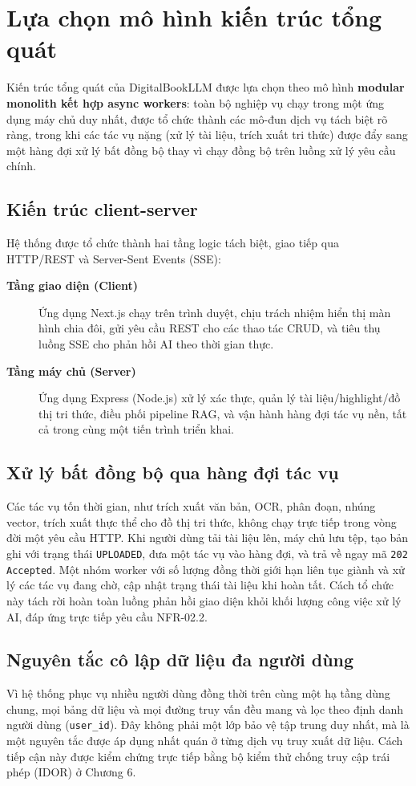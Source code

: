 \section{Lựa chọn mô hình kiến trúc tổng quát}
Kiến trúc tổng quát của DigitalBookLLM được lựa chọn theo mô hình \textbf{modular monolith kết hợp async workers}: toàn bộ nghiệp vụ chạy trong một ứng dụng máy chủ duy nhất, được tổ chức thành các mô-đun dịch vụ tách biệt rõ ràng, trong khi các tác vụ nặng (xử lý tài liệu, trích xuất tri thức) được đẩy sang một hàng đợi xử lý bất đồng bộ thay vì chạy đồng bộ trên luồng xử lý yêu cầu chính.

\subsection{Kiến trúc client-server}
Hệ thống được tổ chức thành hai tầng logic tách biệt, giao tiếp qua HTTP/REST và Server-Sent Events (SSE):

\begin{description}
    \item[\textbf{Tầng giao diện (Client)}] Ứng dụng Next.js chạy trên trình duyệt, chịu trách nhiệm hiển thị màn hình chia đôi, gửi yêu cầu REST cho các thao tác CRUD, và tiêu thụ luồng SSE cho phản hồi AI theo thời gian thực.
    \item[\textbf{Tầng máy chủ (Server)}] Ứng dụng Express (Node.js) xử lý xác thực, quản lý tài liệu/highlight/đồ thị tri thức, điều phối pipeline RAG, và vận hành hàng đợi tác vụ nền, tất cả trong cùng một tiến trình triển khai.
\end{description}

\subsection{Xử lý bất đồng bộ qua hàng đợi tác vụ}
Các tác vụ tốn thời gian, như trích xuất văn bản, OCR, phân đoạn, nhúng vector, trích xuất thực thể cho đồ thị tri thức, không chạy trực tiếp trong vòng đời một yêu cầu HTTP. Khi người dùng tải tài liệu lên, máy chủ lưu tệp, tạo bản ghi với trạng thái \texttt{UPLOADED}, đưa một tác vụ vào hàng đợi, và trả về ngay mã \texttt{202 Accepted}. Một nhóm worker với số lượng đồng thời giới hạn liên tục giành và xử lý các tác vụ đang chờ, cập nhật trạng thái tài liệu khi hoàn tất. Cách tổ chức này tách rời hoàn toàn luồng phản hồi giao diện khỏi khối lượng công việc xử lý AI, đáp ứng trực tiếp yêu cầu NFR-02.2.

\subsection{Nguyên tắc cô lập dữ liệu đa người dùng}
Vì hệ thống phục vụ nhiều người dùng đồng thời trên cùng một hạ tầng dùng chung, mọi bảng dữ liệu và mọi đường truy vấn đều mang và lọc theo định danh người dùng (\texttt{user\_id}). Đây không phải một lớp bảo vệ tập trung duy nhất, mà là một nguyên tắc được áp dụng nhất quán ở từng dịch vụ truy xuất dữ liệu. Cách tiếp cận này được kiểm chứng trực tiếp bằng bộ kiểm thử chống truy cập trái phép (IDOR) ở Chương 6.
